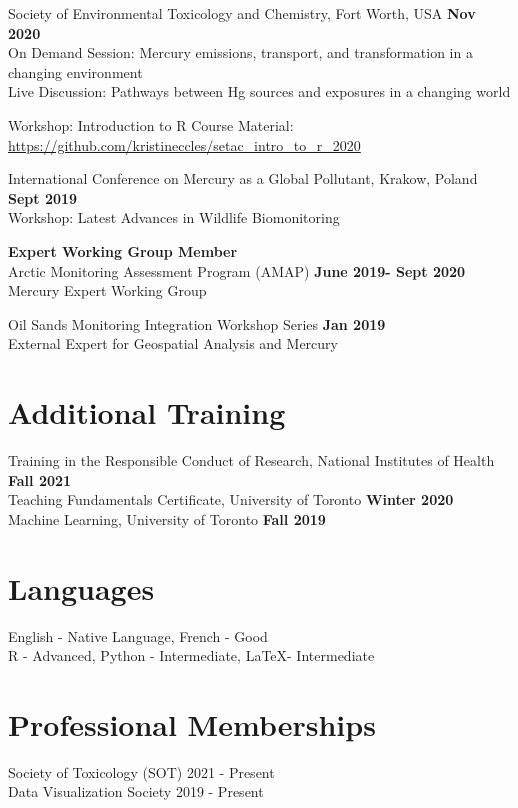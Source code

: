 \documentclass[margin,line]{res}
\begin{document}
\begin{resume}
Society of Environmental Toxicology and Chemistry, Fort Worth, USA \hfill {\bf  Nov 2020}\\
On Demand Session: Mercury emissions, transport, and transformation in a changing environment\\
Live Discussion: Pathways between Hg sources and exposures in a changing world

Workshop: Introduction to R
Course Material: \url{https://github.com/kristineccles/setac_intro_to_r_2020}

International Conference on Mercury as a Global Pollutant, Krakow, Poland \hfill {\bf Sept 2019}\\
Workshop: Latest Advances in Wildlife Biomonitoring

{\bf Expert Working Group Member}\\
Arctic Monitoring Assessment Program (AMAP)
\hfill {\bf  June 2019- Sept 2020}\\
Mercury Expert Working Group

Oil Sands Monitoring Integration Workshop Series
\hfill {\bf  Jan 2019}\\
External Expert for Geospatial Analysis and Mercury

\vspace*{.1in}

\section{\sc Additional Training}
Training in the Responsible Conduct of Research, National Institutes of Health \hfill {\bf  Fall 2021}\\
Teaching Fundamentals Certificate, University of Toronto
\hfill {\bf  Winter 2020}\\
Machine Learning, University of Toronto
\hfill {\bf  Fall 2019}

\vspace*{.1in}

\section{\sc Languages}

English - Native Language, French - Good\\
R - Advanced, Python - Intermediate, LaTeX- Intermediate

\vspace*{.1in}

\section{\sc Professional Memberships}
Society of Toxicology (SOT) 2021 - Present \\
Data Visualization Society 2019 - Present\\


\end{resume}
\end{document}
